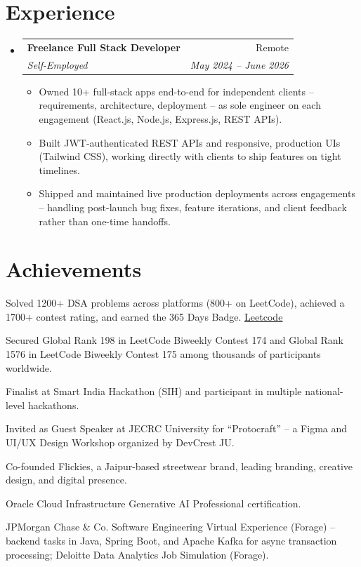 \documentclass[letterpaper,11pt]{article}
\makeatletter
\newcommand{\resumeItem}[1]{
  \item\small{
    {#1 \vspace{-4pt}}
  }
}
\newcommand{\resumeSubheading}[4]{
  \vspace{-2pt}\item
    \begin{tabular*}{0.97\textwidth}[t]{l@{\extracolsep{\fill}}r}
      \textbf{#1} & #2 \\
      \textit{\small#3} & \textit{\small #4} \\
    \end{tabular*}\vspace{-9pt}
}
\newcommand{\resumeSubHeadingListStart}{\begin{itemize}[leftmargin=0.15in, label={}]}
\newcommand{\resumeSubHeadingListEnd}{\end{itemize}}
\newcommand{\resumeItemListStart}{\begin{itemize}[label=$\vcenter{\hbox{\tiny$\bullet$}}$]}
\newcommand{\resumeItemListEnd}{\end{itemize}\vspace{-7pt}}
\makeatother
\begin{document}
\section{Experience}
\resumeSubHeadingListStart

\resumeSubheading
  {Freelance Full Stack Developer}{Remote}
  {Self-Employed}{May 2024 -- June 2026}
  \resumeItemListStart
    \resumeItem{Owned 10+ full-stack apps end-to-end for independent clients -- requirements, architecture, deployment -- as sole engineer on each engagement (React.js, Node.js, Express.js, REST APIs).}
    \resumeItem{Built JWT-authenticated REST APIs and responsive, production UIs (Tailwind CSS), working directly with clients to ship features on tight timelines.}
    \resumeItem{Shipped and maintained live production deployments across engagements -- handling post-launch bug fixes, feature iterations, and client feedback rather than one-time handoffs.}
  \resumeItemListEnd

\resumeSubHeadingListEnd


\section{Achievements}
\vspace{-2pt}
\begin{itemize}[leftmargin=0.15in, label=$\vcenter{\hbox{\tiny$\bullet$}}$, itemsep=-4pt, topsep=0pt]
  \small{
 \item{Solved 1200+ DSA problems across platforms (800+ on LeetCode), achieved a 1700+ contest rating, and earned the 365 Days Badge. \hfill \href{https://leetcode.com/u/mannsvijay/}{\underline{Leetcode}}}
  
  \item{Secured Global Rank 198 in LeetCode Biweekly Contest 174 and Global Rank 1576 in LeetCode Biweekly Contest 175 among thousands of participants worldwide.}
  
  \item{Finalist at Smart India Hackathon (SIH) and participant in multiple national-level hackathons.}
  
  \item{Invited as Guest Speaker at JECRC University for ``Protocraft'' -- a Figma and UI/UX Design Workshop organized by DevCrest JU.}
  
  \item{Co-founded Flickies, a Jaipur-based streetwear brand, leading branding, creative design, and digital presence.}
  
  \item{Oracle Cloud Infrastructure Generative AI Professional certification.}
  
  \item{JPMorgan Chase \& Co. Software Engineering Virtual Experience (Forage) -- backend tasks in Java, Spring Boot, and Apache Kafka for async transaction processing; Deloitte Data Analytics Job Simulation (Forage).}
  }
\end{itemize}

\end{document}
